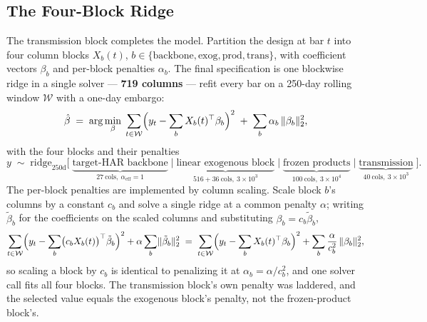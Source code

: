 \subsection{The Four-Block Ridge}

The transmission block completes the model. Partition the design at bar $t$
into four column blocks $X_b(t)$, $b \in \{\text{backbone}, \text{exog},
\text{prod}, \text{trans}\}$, with coefficient vectors $\beta_b$ and
per-block penalties $\alpha_b$. The final specification is one blockwise
ridge in a single solver --- \textbf{719 columns} --- refit every bar on a
250-day rolling window $\mathcal{W}$ with a one-day embargo:
\[
\hat\beta \;=\; \arg\min_{\beta}\;
\sum_{t \in \mathcal{W}}
\Bigl( y_t - \sum_{b} X_b(t)^{\top} \beta_b \Bigr)^2
\;+\; \sum_{b} \alpha_b \, \lVert \beta_b \rVert_2^2 ,
\]
with the four blocks and their penalties
\[
y \;\sim\; \mathrm{ridge}_{250\mathrm{d}}
\bigl[\;
\underbrace{\text{target-HAR backbone}}_{27\ \text{cols},\ \alpha_{\mathrm{eff}} = 1}
\;\big|\;
\underbrace{\text{linear exogenous block}}_{516 + 36\ \text{cols},\ 3\times10^{3}}
\;\big|\;
\underbrace{\text{frozen products}}_{100\ \text{cols},\ 3\times10^{4}}
\;\big|\;
\underbrace{\text{transmission}}_{40\ \text{cols},\ 3\times10^{3}}
\;\bigr].
\]
The per-block penalties are implemented by column scaling. Scale block $b$'s
columns by a constant $c_b$ and solve a single ridge at a common penalty
$\alpha$; writing $\tilde\beta_b$ for the coefficients on the scaled columns
and substituting $\beta_b = c_b \tilde\beta_b$,
\[
\sum_{t \in \mathcal{W}}
\Bigl( y_t - \sum_{b} \bigl( c_b X_b(t) \bigr)^{\top} \tilde\beta_b \Bigr)^2
+ \alpha \sum_{b} \lVert \tilde\beta_b \rVert_2^2
\;=\;
\sum_{t \in \mathcal{W}}
\Bigl( y_t - \sum_{b} X_b(t)^{\top} \beta_b \Bigr)^2
+ \sum_{b} \frac{\alpha}{c_b^{2}} \, \lVert \beta_b \rVert_2^2 ,
\]
so scaling a block by $c_b$ is identical to penalizing it at
$\alpha_b = \alpha / c_b^{2}$, and one solver call fits all four blocks. The
transmission block's own penalty was laddered, and the selected value equals
the exogenous block's penalty, not the frozen-product block's.

